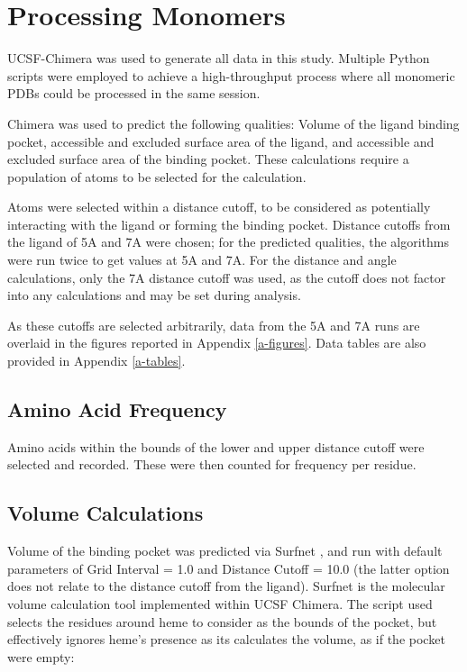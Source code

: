 \documentclass[a4paper, nobind]{templates/ociamthesis}
\begin{document}
\hypertarget{processing-monomers}{%
\section{Processing Monomers}\label{processing-monomers}}

UCSF-Chimera was used to generate all data in this study. Multiple Python scripts were employed to achieve a high-throughput process where all monomeric PDBs could be processed in the same session.

Chimera was used to predict the following qualities: Volume of the ligand binding pocket, accessible and excluded surface area of the ligand, and accessible and excluded surface area of the binding pocket. These calculations require a population of atoms to be selected for the calculation.

Atoms were selected within a distance cutoff, to be considered as potentially interacting with the ligand or forming the binding pocket. Distance cutoffs from the ligand of 5A and 7A were chosen; for the predicted qualities, the algorithms were run twice to get values at 5A and 7A. For the distance and angle calculations, only the 7A distance cutoff was used, as the cutoff does not factor into any calculations and may be set during analysis.

As these cutoffs are selected arbitrarily, data from the 5A and 7A runs are overlaid in the figures reported in Appendix \ref{a-figures}. Data tables are also provided in Appendix \ref{a-tables}.

\hypertarget{amino-acid-frequency}{%
\subsection{Amino Acid Frequency}\label{amino-acid-frequency}}

Amino acids within the bounds of the lower and upper distance cutoff were selected and recorded. These were then counted for frequency per residue.

\hypertarget{volume-calculations}{%
\subsection{Volume Calculations}\label{volume-calculations}}

Volume of the binding pocket was predicted via Surfnet \autocite{Laskowski1995}, and run with default parameters of Grid Interval = 1.0 and Distance Cutoff = 10.0 (the latter option does not relate to the distance cutoff from the ligand). Surfnet is the molecular volume calculation tool implemented within UCSF Chimera. The script used selects the residues around heme to consider as the bounds of the pocket, but effectively ignores heme's presence as its calculates the volume, as if the pocket were empty:
\end{document}
